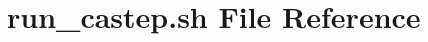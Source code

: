 \hypertarget{run__castep_8sh}{}\section{run\+\_\+castep.\+sh File Reference}
\label{run__castep_8sh}
